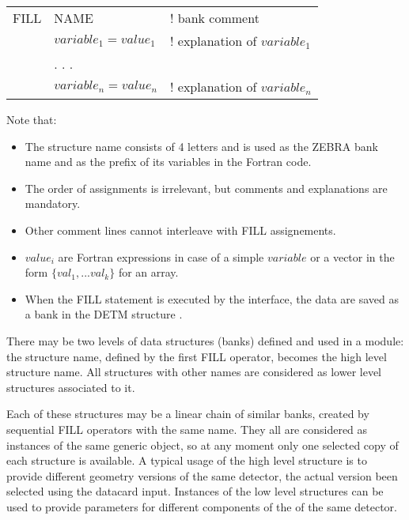 \begin{center}   \begin{tabular}{|cll|}                            \hline
FILL & NAME                  &  ! bank comment                   \\
     & $variable_1=value_1$  &  ! explanation of $variable_1$    \\
     &   . . .        &                                          \\
     & $variable_n=value_n$  &  ! explanation of $variable_n$    \\  \hline
\end{tabular}   \end{center}
Note that:
\begin{itemize} 
\item
The structure name consists of 4 letters  and  is used as the
ZEBRA bank name and as the prefix of its variables in the Fortran code.
\item
The order of assignments is irrelevant, but comments and
explanations are mandatory.
\item
Other comment lines cannot interleave with FILL assignements.
\item
$value_i$ are Fortran expressions in case of a simple $variable$ or
a vector in the form $ \{ val_1, ... val_k \} $ for an array.
\item
When the FILL statement is executed by the \as interface, 
the data are saved as a bank in the DETM structure \cite{slug}.
\end{itemize}
 
There may be two levels of data structures (banks) defined 
and used in a module:
the structure name,  defined by the first FILL operator,  
becomes the high level structure name. 
All  structures with other names are considered as
lower level structures associated to it.

Each of these structures may be a linear chain of similar banks,
created by sequential FILL operators with the same name.
They all are considered as instances of the same generic object, so
at any moment only one selected copy of each structure is available.
A typical usage of the high level structure is to provide different
geometry versions of the same detector,
the actual version been selected using the datacard input.
Instances of the  low level structures  can be used
to provide parameters for different components  of the
of the same detector.
 
